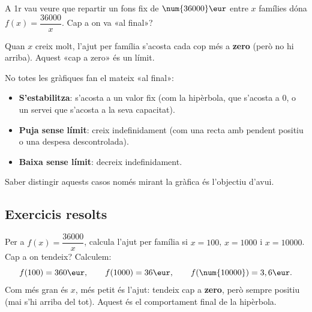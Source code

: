 \begin{exemple}
A 1r vau veure que repartir un fons fix de $\num{36000}\eur$ entre $x$ famílies dóna
$f(x)=\dfrac{\num{36000}}{x}$. Cap a on va «al final»?

\begin{center}

\end{center}

\noindent Quan $x$ creix molt, l'ajut per família s'acosta cada cop més a \textbf{zero}
(però no hi arriba). Aquest «cap a zero» és un límit.
\end{exemple}

\begin{exemple}
No totes les gràfiques fan el mateix «al final»:
\begin{itemize}[leftmargin=1.4em, itemsep=2pt]
  \item \textbf{S'estabilitza}: s'acosta a un valor fix (com la hipèrbola, que s'acosta
        a $0$, o un servei que s'acosta a la seva capacitat).
  \item \textbf{Puja sense límit}: creix indefinidament (com una recta amb pendent
        positiu o una despesa descontrolada).
  \item \textbf{Baixa sense límit}: decreix indefinidament.
\end{itemize}
Saber distingir aquests casos només mirant la gràfica és l'objectiu d'avui.
\end{exemple}

\subsection{Exercicis resolts}

\begin{exresolt}
Per a $f(x)=\dfrac{\num{36000}}{x}$, calcula l'ajut per família si $x=100$, $x=1000$
i $x=\num{10000}$. Cap a on tendeix?
\solucio
Calculem:
\[
f(100)=360\eur,\qquad f(1000)=36\eur,\qquad f(\num{10000})=3,6\eur.
\]
Com més gran és $x$, més petit és l'ajut: tendeix cap a \textbf{zero}, però sempre
positiu (mai s'hi arriba del tot). Aquest és el comportament final de la hipèrbola.
\end{exresolt}

